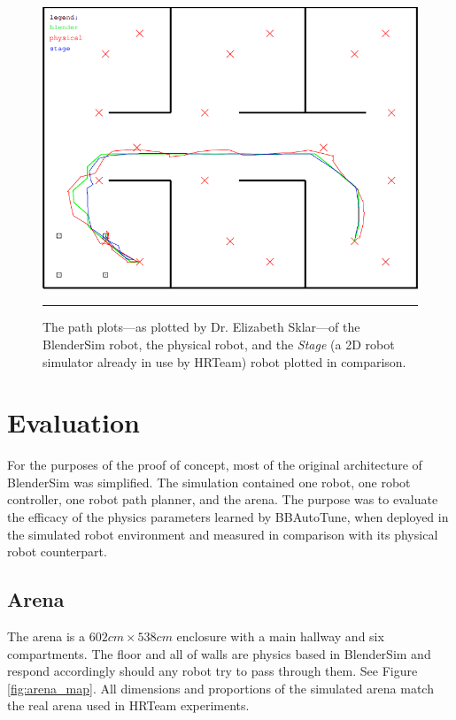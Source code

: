 \begin{figure}[htbp]
\centering
\includegraphics[scale=0.55]{../Figures/Chapter5/const_motion_model_plotted.png}
\rule{35em}{0.5pt}
\caption[Comparative Path Plots]{The path plots---as plotted by Dr. Elizabeth Sklar---of the BlenderSim robot, the physical robot, and the \textit{Stage} (a 2D robot simulator already in use by HRTeam)\cite{website:stage} robot plotted in comparison.}
\label{sklarplots}
\end{figure}

\section{Evaluation}

For the purposes of the proof of concept, most of the original architecture of BlenderSim was simplified. The simulation contained one robot, one robot controller, one robot path planner, and the arena. The purpose was to evaluate the efficacy of the physics parameters learned by BBAutoTune, when deployed in the simulated robot environment and measured in comparison with its physical robot counterpart.

\subsection{Arena}

The arena is a $602cm\times538cm$ enclosure with a main hallway and six compartments. The floor and all of walls are physics based in BlenderSim and respond accordingly should any robot try to pass through them. See Figure \ref{fig:arena_map}. All dimensions and proportions of the simulated arena match the real arena used in HRTeam experiments. 

